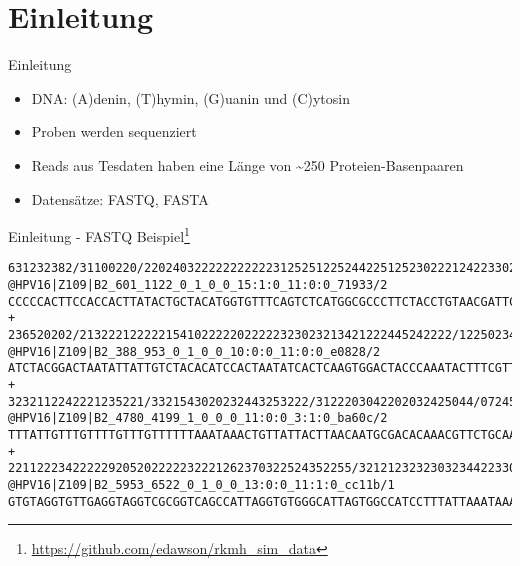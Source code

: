 \section{Einleitung}

\begin{frame}{Einleitung}
    \begin{itemize}
        \item DNA: (A)denin, (T)hymin, (G)uanin und (C)ytosin \pause
        \item Proben werden sequenziert \pause
        \item Reads aus Tesdaten haben eine Länge von \textasciitilde 250 Proteien-Basenpaaren \pause
        \item Datensätze: FASTQ, FASTA
    \end{itemize}
\end{frame}




\begin{frame}[fragile]{Einleitung - FASTQ Beispiel\footnote{\url{https://github.com/edawson/rkmh_sim_data}}}
    \begin{verbatim}
631232382/31100220/2202403222222222223125251225244225125230222124223302
@HPV16|Z109|B2_601_1122_0_1_0_0_15:1:0_11:0:0_71933/2
CCCCCACTTCCACCACTTATACTGCTACATGGTGTTTCAGTCTCATGGCGCCCTTCTACCTGTAACGATTC
+
236520202/2132221222221541022222022222323023213421222445242222/12250234
@HPV16|Z109|B2_388_953_0_1_0_0_10:0:0_11:0:0_e0828/2
ATCTACGGACTAATATTATTGTCTACACATCCACTAATATCACTCAAGTGGACTACCCAAATACTTTCGTT
+
3232112242221235221/3321543020232443253222/3122203042202032425044/07245
@HPV16|Z109|B2_4780_4199_1_0_0_0_11:0:0_3:1:0_ba60c/2
TTTATTGTTTGTTTTGTTTGTTTTTTAAATAAACTGTTATTACTTAACAATGCGACACAAACGTTCTGCAA
+
221122234222229205202222232221262370322524352255/3212123232303234422330
@HPV16|Z109|B2_5953_6522_0_1_0_0_13:0:0_11:1:0_cc11b/1
GTGTAGGTGTTGAGGTAGGTCGCGGTCAGCCATTAGGTGTGGGCATTAGTGGCCATCCTTTATTAAATAAA
    \end{verbatim}
\end{frame}

